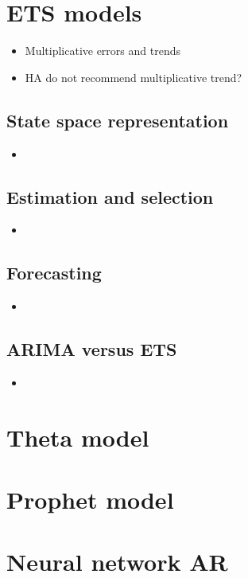 \documentclass{article}
\begin{document}
\section{ETS models}

\begin{itemize}
\item Multiplicative errors and trends
\item HA do not recommend multiplicative trend?
\end{itemize}

\subsection{State space representation}

\begin{itemize}
\item 
\end{itemize}

\subsection{Estimation and selection}

\begin{itemize}
\item 
\end{itemize}

\subsection{Forecasting}

\begin{itemize}
\item 
\end{itemize}

\subsection{ARIMA versus ETS}
\begin{itemize}
\item 
\end{itemize}

\section{Theta model}

\section{Prophet model}

\section{Neural network AR}
\end{document}
